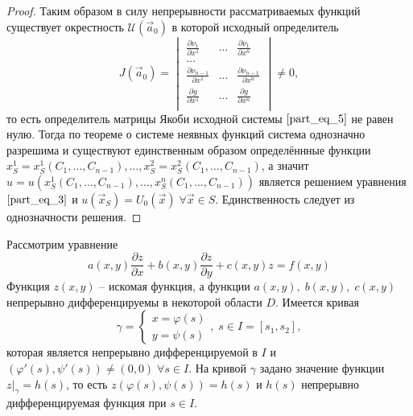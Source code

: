 \begin{proof}
    Таким образом в силу непрерывности рассматриваемых функций существует окрестность $\mathcal{U} \left( \vec{a}_0 \right)$ в которой исходный определитель
    \begin{equation*}
    	J \left( \vec{a}_0 \right) =
    	\begin{vmatrix}
    		\frac{\partial \nu_1}{\partial x^1} & \dots & \frac{\partial \nu_1}{\partial x^n}             \\
    		\dots                                                                                         \\
    		\frac{\partial \nu_{n - 1}}{\partial x^1} & \dots & \frac{\partial \nu_{n - 1}}{\partial x^n} \\
    		\frac{\partial g}{\partial x^1} & \dots & \frac{\partial g}{\partial x^n}                     \\
    	\end{vmatrix} \neq 0,
    \end{equation*}
    то есть определитель матрицы Якоби исходной системы $\eqref{part_eq_5}$ не равен нулю. Тогда по теореме о системе неявных функций система однозначно разрешима и существуют единственным образом определённные функции $x^1_S = x^1_S \left( C_1, \dots, C_{n - 1} \right), \dots, x^2_S = x^2_S \left( C_1, \dots, C_{n - 1} \right)$, а значит $u = u \left( x^1_S \left( C_1, \dots, C_{n - 1} \right), \dots, x^n_S \left( C_1, \dots, C_{n - 1} \right) \right)$ является решением уравнения $\eqref{part_eq_3}$ и $u \left( \vec{x}_S \right) = U_0 \left( \vec{x} \right) \; \forall \vec{x} \in S$. Единственность следует из однозначности решения.
    
\end{proof}

Рассмотрим уравнение
\begin{equation}
a(x, y) \frac{\partial z}{\partial x} + b(x, y) \frac{\partial z}{\partial y} + c(x, y) z = f(x, y)
\label{part_eq_6}
\end{equation}
Функция $z(x, y)$ -- искомая функция, а функции $a(x, y), \; b(x, y), \; c(x, y)$ непрерывно дифференцируемы в некоторой области $D$. Имеется кривая 
\begin{equation*}
\gamma = 
\begin{cases}
	x = \varphi(s) \\
	y = \psi(s)
\end{cases}, \; s \in I = [s_1, s_2],
\end{equation*}
которая является непрерывно дифференцируемой в $I$ и $(\varphi'(s), \psi'(s)) \neq (0, 0) \; \forall s \in I$. На кривой $\gamma$ задано значение функции $z \big|_{\gamma} = h(s)$, то есть $z(\varphi(s), \psi(s)) = h(s)$ и $h(s)$ непрерывно дифференцируемая функция при $s \in I$.

